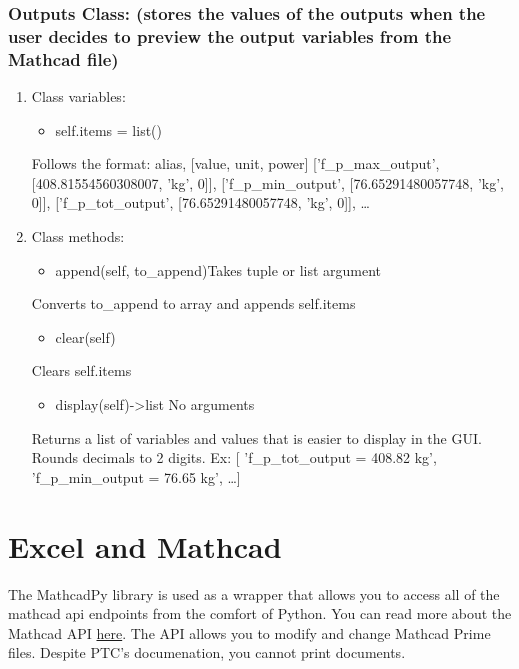\documentclass[11pt]{article}
\begin{document}
\subsubsection{Outputs Class: (stores the values of the outputs when the user decides to preview the output variables from the Mathcad file)}
\label{sec:org7b556e1}
\begin{enumerate}
\item Class variables:
\label{sec:org937b509}

\begin{itemize}
\item self.items = list()
\end{itemize}
Follows the format:
alias, [value, unit, power]
['f\_p\_max\_output', [408.81554560308007, 'kg', 0]],
['f\_p\_min\_output', [76.65291480057748, 'kg', 0]],
['f\_p\_tot\_output', [76.65291480057748, 'kg', 0]],
\ldots{}
\item Class methods:
\label{sec:orgadde688}
\begin{itemize}
\item append(self, to\_append)Takes tuple or list argument
\end{itemize}
Converts to\_append to array and appends self.items

\begin{itemize}
\item clear(self)
\end{itemize}
Clears self.items

\begin{itemize}
\item display(self)->list No arguments
\end{itemize}
Returns a list of variables and values that is easier to display in the GUI. Rounds decimals to 2 digits.
Ex: [ 'f\_p\_tot\_output = 408.82 kg', 'f\_p\_min\_output = 76.65 kg', \ldots{}]
\end{enumerate}

\section{Excel and Mathcad}
\label{sec:org60b0758}

The MathcadPy library is used as a wrapper that allows you to access all of the mathcad api endpoints from the comfort of Python. You can read more about the Mathcad API \href{https://support.ptc.com/help/mathcad/r7.0/en/index.html\#page/PTC\_Mathcad\_Help\%2Fmathcad\_and\_automation\_api.html\%23}{here}. The API allows you to modify and change Mathcad Prime files. Despite PTC's documenation, you cannot print documents.
\end{document}
